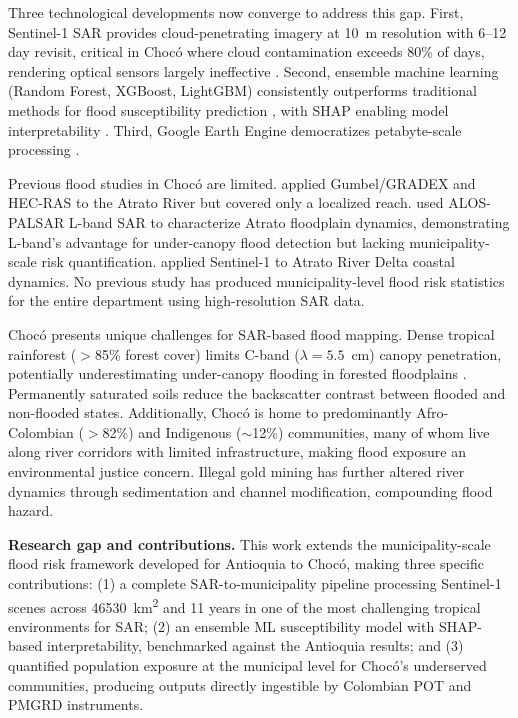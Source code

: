 \documentclass{article}
\begin{document}
Three technological developments now converge to address this gap. First, Sentinel-1 SAR provides cloud-penetrating imagery at \SI{10}{\metre} resolution with 6--12 day revisit, critical in Choc\'o where cloud contamination exceeds 80\% of days, rendering optical sensors largely ineffective \citep{Twele2016, DeVries2020}. Second, ensemble machine learning (Random Forest, XGBoost, LightGBM) consistently outperforms traditional methods for flood susceptibility prediction \citep{Mosavi2018, Darabi2021}, with SHAP enabling model interpretability \citep{Lundberg2017}. Third, Google Earth Engine democratizes petabyte-scale processing \citep{Gorelick2017}.

Previous flood studies in Choc\'o are limited. \citet{MosqueraMachado2007} applied Gumbel/GRADEX and HEC-RAS to the Atrato River but covered only a localized reach. \citet{PalominoAngel2019} used ALOS-PALSAR L-band SAR to characterize Atrato floodplain dynamics, demonstrating L-band's advantage for under-canopy flood detection but lacking municipality-scale risk quantification. \citet{VasquezSalazar2024} applied Sentinel-1 to Atrato River Delta coastal dynamics. No previous study has produced municipality-level flood risk statistics for the entire department using high-resolution SAR data.

Choc\'o presents unique challenges for SAR-based flood mapping. Dense tropical rainforest ($>$85\% forest cover) limits C-band ($\lambda = 5.5$~cm) canopy penetration, potentially underestimating under-canopy flooding in forested floodplains \citep{PalominoAngel2019}. Permanently saturated soils reduce the backscatter contrast between flooded and non-flooded states. Additionally, Choc\'o is home to predominantly Afro-Colombian ($>$82\%) and Indigenous ($\sim$12\%) communities, many of whom live along river corridors with limited infrastructure, making flood exposure an environmental justice concern. Illegal gold mining has further altered river dynamics through sedimentation and channel modification, compounding flood hazard.

\textbf{Research gap and contributions.} This work extends the municipality-scale flood risk framework developed for Antioquia \citep{EspinalMaya2026} to Choc\'o, making three specific contributions: (1) a complete SAR-to-municipality pipeline processing Sentinel-1 scenes across \SI{46530}{\kilo\metre\squared} and 11 years in one of the most challenging tropical environments for SAR; (2) an ensemble ML susceptibility model with SHAP-based interpretability, benchmarked against the Antioquia results; and (3) quantified population exposure at the municipal level for Choc\'o's underserved communities, producing outputs directly ingestible by Colombian POT and PMGRD instruments.
\end{document}

